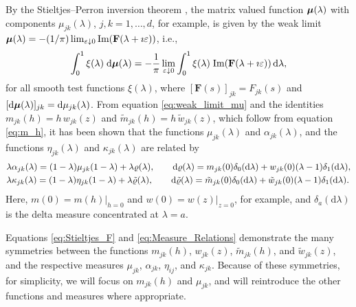 \documentclass{cmslatex}
\renewcommand{\d}{\text{d}}
\newcommand\bmu{\mbox{\boldmath${\mu}$}}
\begin{document}
By the Stieltjes--Perron inversion theorem
\cite{Henrici:1974:v2,MILTON:2002:TC}, the matrix valued function
$\bmu(\lambda)$ with components $\mu_{jk}(\lambda)$, $j,k=1,\ldots,d$, for example, is
given by the weak limit  
$\bmu(\lambda)=-(1/\pi)\lim_{\varepsilon\downarrow0}\text{Im}(\mathbf{F}(\lambda+\imath\varepsilon))$, i.e., 
%
\begin{align}\label{eq:weak_limit_mu}
  \int_0^1\xi(\lambda)\;\d\bmu(\lambda)
  =-\frac{1}{\pi}\lim_{\varepsilon\downarrow0}
        \int_0^1\xi(\lambda)\;\text{Im}(\mathbf{F}(\lambda+\imath\varepsilon))\, \d\lambda,
\end{align}
%
for all smooth test functions $\xi(\lambda)$, where
$[\mathbf{F}(s)]_{jk}=F_{jk}(s)$ and
$[\d\bmu(\lambda)]_{jk}=\d\mu_{jk}(\lambda)$. From equation 
\eqref{eq:weak_limit_mu} and the identities 
$m_{jk}(h)=h\,w_{jk}(z)$ and $\tilde{m}_{jk}(h)=h\,\tilde{w}_{jk}(z)$,
which follow from equation \eqref{eq:m_h}, it has been
shown \cite{Murphy:JMP:063506} that the functions $\mu_{jk}(\lambda)$ and
$\alpha_{jk}(\lambda)$, and the functions $\eta_{jk}(\lambda)$ and $\kappa_{jk}(\lambda)$ are
related by
%
\begin{align}\label{eq:Measure_Relations}
  &\lambda\alpha_{jk}(\lambda)=(1-\lambda)\mu_{jk}(1-\lambda)+\lambda\varrho(\lambda), \qquad
  \d\varrho(\lambda)=m_{jk}(0)\delta_0(\d\lambda)+w_{jk}(0)(\lambda-1)\delta_1(\d\lambda),
  \notag     \\
  &\lambda\kappa_{jk}(\lambda)=(1-\lambda)\eta_{jk}(1-\lambda)+\lambda\tilde{\varrho}(\lambda), \qquad
  \d\tilde{\varrho}(\lambda)=\tilde{m}_{jk}(0)\delta_0(\d\lambda)+\tilde{w}_{jk}(0)(\lambda-1)\delta_1(\d\lambda).  
\end{align}
%
Here, $m(0)=m(h)|_{h=0}$ and $w(0)=w(z)|_{z=0}$, for example, and
$\delta_a(\d\lambda)$ is the delta measure concentrated at $\lambda=a$.



Equations
\eqref{eq:Stieltjes_F} and \eqref{eq:Measure_Relations} demonstrate
the many symmetries between 
the functions $m_{jk}(h)$, $w_{jk}(z)$, $\tilde{m}_{jk}(h)$, and
$\tilde{w}_{jk}(z)$, and the respective measures $\mu_{jk}$, $\alpha_{jk}$,
$\eta_{ij}$, and $\kappa_{jk}$. Because of these symmetries, for simplicity,
we will focus on $m_{jk}(h)$ and $\mu_{jk}$, and will reintroduce the
other functions and measures where appropriate.  
\end{document}
